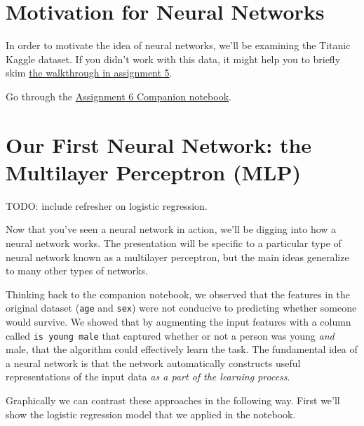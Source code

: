\documentclass[assignment06_Solutions]{subfiles}
\begin{document}
\section{Motivation for Neural Networks}

In order to motivate the idea of neural networks, we'll be examining the Titanic Kaggle dataset.  If you didn't work with this data, it might help you to briefly skim \href{https://colab.research.google.com/github/mlfa19/assignments/blob/master/Module\%201/05/assignment05.ipynb#scrollTo=56C4fPtK7YeQ}{the walkthrough in assignment 5}.

\vspace{1em}
\begin{externalresources}
Go through the \href{https://colab.research.google.com/github/mlfa19/assignments/blob/master/Module\%201/06/Assignment_6_Companion.ipynb}{Assignment 6 Companion notebook}.
\end{externalresources}

\section{Our First Neural Network: the Multilayer Perceptron (MLP)}

TODO: include refresher on logistic regression.

Now that you've seen a neural network in action, we'll be digging into how a neural network works.  The presentation will be specific to a particular type of neural network known as a multilayer perceptron, but the main ideas generalize to many other types of networks.

Thinking back to the companion notebook, we observed that the features in the original dataset ({\tt age} and {\tt sex}) were not conducive to predicting whether someone would survive.  We showed that by augmenting the input features with a column called {\tt is young male} that captured whether or not a person was young \emph{and} male, that the algorithm could effectively learn the task.  The fundamental idea of a neural network is that the network automatically constructs useful representations of the input data \emph{as a part of the learning process}.

Graphically we can contrast these approaches in the following way. First we'll show the logistic regression model that we applied in the notebook.
\end{document}
